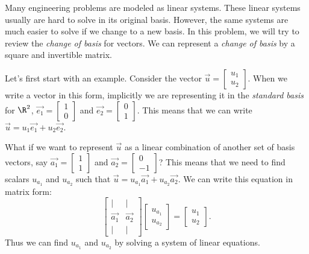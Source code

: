 
Many engineering problems are modeled as linear systems.
These linear systems usually are hard to solve in its original basis.
However, the same systems are much easier to solve if we change to a new basis.
In this problem, we will try to review the \emph{change of basis} for vectors.
We can represent a \emph{change of basis} by a square and invertible matrix.
\par

Let's first start with an example.
Consider the vector $\vec{u} = \begin{bmatrix} u_1 \\ u_2 \end{bmatrix}$.
When we write a vector in this form, implicitly we are representing it in the \emph{standard basis} for $\R^{2}$, $\vec{e_1} = \begin{bmatrix} 1 \\ 0 \end{bmatrix}$ and $\vec{e_2} = \begin{bmatrix} 0 \\ 1 \end{bmatrix}$.
This means that we can write $\vec{u} = u_1\vec{e_1} + u_2\vec{e_2}$.
\par

What if we want to represent $\vec{u}$ as a linear combination of another set of basis vectors, say $\vec{a_1} = \begin{bmatrix} 1 \\ 1 \end{bmatrix}$ and $\vec{a_2} = \begin{bmatrix} 0 \\ -1 \end{bmatrix}$?
This means that we need to find scalars $u_{a_1}$ and $u_{a_2}$ such that $\vec{u} = u_{a_1}\vec{a_1} + u_{a_2}\vec{a_2}$.
We can write this equation in matrix form:
\[
  \begin{bmatrix}
    | & | \\
    \vec{a_1} & \vec{a_2} \\
    | & |
  \end{bmatrix}
  \begin{bmatrix} u_{a_1} \\ u_{a_2} \end{bmatrix} = \begin{bmatrix} u_{1} \\ u_{2} \end{bmatrix}
.\]
Thus we can find $u_{a_1}$ and $u_{a_2}$ by solving a system of linear equations.
\par


